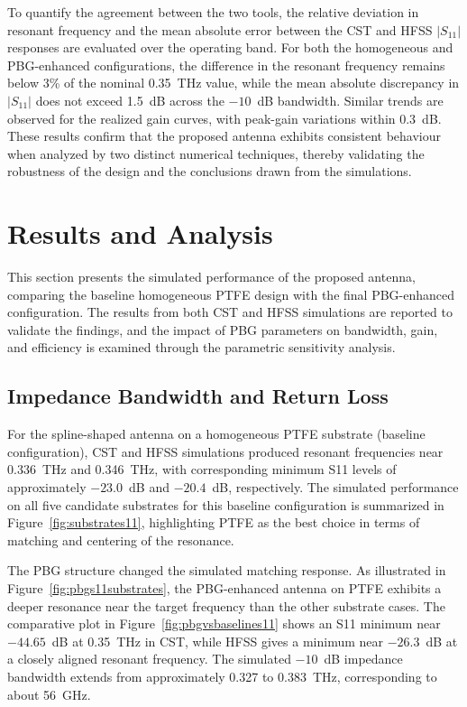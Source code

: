 \documentclass[draft]{agujournal2019}
\begin{document}
To quantify the agreement between the two tools, the relative deviation in resonant frequency and the mean absolute error between the CST and HFSS $\lvert S_{11} \rvert$ responses are evaluated over the operating band. For both the homogeneous and PBG-enhanced configurations, the difference in the resonant frequency remains below 3\% of the nominal 0.35~THz value, while the mean absolute discrepancy in $\lvert S_{11} \rvert$ does not exceed 1.5~dB across the \(-10\)~dB bandwidth. Similar trends are observed for the realized gain curves, with peak-gain variations within 0.3~dB. These results confirm that the proposed antenna exhibits consistent behaviour when analyzed by two distinct numerical techniques, thereby validating the robustness of the design and the conclusions drawn from the simulations.

\section{Results and Analysis}
\label{sec:results}

This section presents the simulated performance of the proposed antenna, comparing the baseline homogeneous PTFE design with the final PBG-enhanced configuration. The results from both CST and HFSS simulations are reported to validate the findings, and the impact of PBG parameters on bandwidth, gain, and efficiency is examined through the parametric sensitivity analysis.

\subsection{Impedance Bandwidth and Return Loss}
\label{subsec:s11_bw}

For the spline-shaped antenna on a homogeneous PTFE substrate (baseline configuration), CST and HFSS simulations produced resonant frequencies near 0.336~THz and 0.346~THz, with corresponding minimum S11 levels of approximately $-23.0$~dB and $-20.4$~dB, respectively. The simulated performance on all five candidate substrates for this baseline configuration is summarized in Figure~\ref{fig:substrates11}, highlighting PTFE as the best choice in terms of matching and centering of the resonance.

The PBG structure changed the simulated matching response. As illustrated in Figure~\ref{fig:pbgs11substrates}, the PBG-enhanced antenna on PTFE exhibits a deeper resonance near the target frequency than the other substrate cases. The comparative plot in Figure~\ref{fig:pbgvsbaselines11} shows an S11 minimum near $-44.65$~dB at 0.35~THz in CST, while HFSS gives a minimum near $-26.3$~dB at a closely aligned resonant frequency. The simulated $-10$~dB impedance bandwidth extends from approximately 0.327 to 0.383~THz, corresponding to about 56~GHz.
\end{document}
